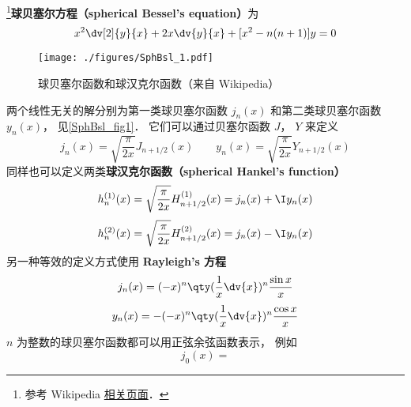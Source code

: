 

\footnote{参考 Wikipedia \href{https://en.wikipedia.org/wiki/Bessel_function}{相关页面}．}\textbf{球贝塞尔方程（spherical Bessel's equation）}为
\begin{equation}
x^2 \dv[2]{y}{x} + 2x \dv{y}{x} + [x^2 - n(n + 1)]y = 0
\end{equation}
\begin{figure}[ht]
\centering
\texttt{[image: ./figures/SphBsl\_1.pdf]}
\caption{球贝塞尔函数和球汉克尔函数（来自 Wikipedia）} \label{SphBsl_fig1}
\end{figure}
两个线性无关的解分别为第一类球贝塞尔函数 $j_n(x)$ 和第二类球贝塞尔函数 $y_n(x)$， 见\autoref{SphBsl_fig1}． 它们可以通过贝塞尔函数 $J$， $Y$ 来定义
\begin{equation}
j_n(x) = \sqrt{\frac{\pi}{2x}} J_{n+1/2}(x)
\qquad
y_n(x) = \sqrt{\frac{\pi}{2x}} Y_{n+1/2}(x)
\end{equation}
同样也可以定义两类\textbf{球汉克尔函数（spherical Hankel's function）}
\begin{equation}
h_n^{(1)}(x) = \sqrt {\frac{\pi }{2x}} H_{n+1/2}^{(1)}(x) = j_n(x) + \I y_n(x)
\end{equation}
\begin{equation}
h_n^{(2)}(x) = \sqrt{\frac{\pi }{2x}} H_{n+1/2}^{(2)}(x) = j_n(x) - \I y_n(x)
\end{equation}
另一种等效的定义方式使用 \textbf{Rayleigh's 方程}
\begin{equation}
j_n(x) = (-x)^n \qty(\frac{1}{x} \dv{x})^n \frac{\sin x}{x}
\end{equation}
\begin{equation}
y_n(x) = -(-x)^n \qty(\frac{1}{x} \dv{x})^n \frac{\cos x}{x}
\end{equation}
$n$ 为整数的球贝塞尔函数都可以用正弦余弦函数表示， 例如
\begin{equation}
j_0(x) = 
\end{equation}

